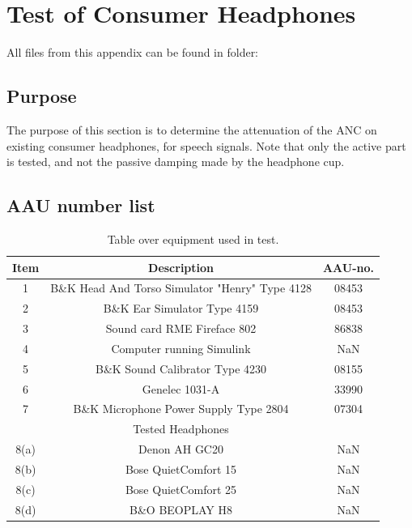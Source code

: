 
\section{Test of Consumer Headphones}

All files from this appendix can be found in folder: \\

\subsection{Purpose}
The purpose of this section is to determine the attenuation of the ANC on existing consumer headphones, for speech signals. 
Note that only the active part is tested, and not the passive damping made by the headphone cup.


\subsection{AAU number list}
\begin{table}[H]
	\centering
	\begin{tabular}{ c c c } \toprule
	{Item}	&	{Description} 								& {AAU-no}. \\ 
								\bottomrule 
		1	&	B\&K Head And Torso Simulator "Henry" Type 4128	& 08453	\\
		2	&	B\&K Ear Simulator Type 4159				& 08453		\\
		3	&	Sound card RME Fireface 802					& 86838		\\
		4	&	Computer running Simulink					& NaN		\\
		5	&	B\&K Sound Calibrator Type 4230				& 08155		\\ 
		6	&	Genelec 1031-A								& 33990		\\ 
		7	& 	B\&K Microphone Power Supply Type 2804		& 07304		\\
								\bottomrule
							& Tested Headphones 			& 			\\
								\bottomrule
		8(a)	& Denon AH GC20 								& NaN 		\\
		8(b)	& Bose QuietComfort 15 							& NaN 		\\
		8(c)	& Bose QuietComfort 25						 	& NaN		\\
		8(d)	& B\&O BEOPLAY H8 								& NaN		\\
								\bottomrule
	\end{tabular}
	\caption{Table over equipment used in test.}
	\label{tab:UsedEquipmentListConsumerHP}
\end{table}

